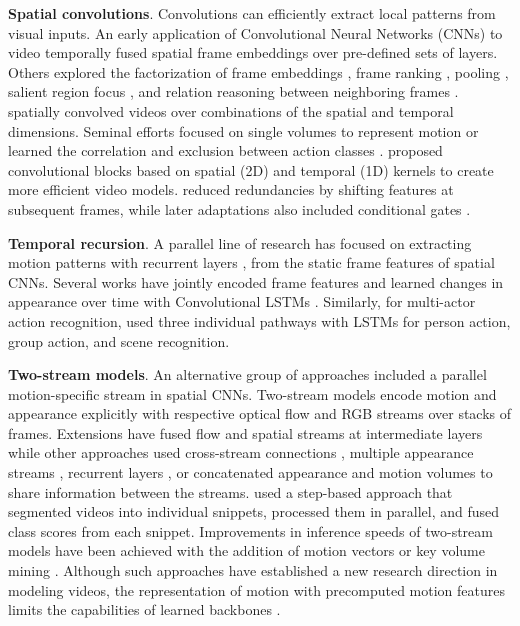 \noindent
\textbf{Spatial convolutions}. Convolutions can efficiently extract local patterns from visual inputs. An early application of Convolutional Neural Networks (CNNs) to video  temporally fused spatial frame embeddings over pre-defined sets of layers. Others explored the factorization of frame embeddings , frame ranking , pooling , salient region focus , and relation reasoning between neighboring frames .  spatially convolved videos over combinations of the spatial and temporal dimensions. Seminal efforts focused on single volumes to represent motion  or learned the correlation and exclusion between action classes .  proposed convolutional blocks based on spatial (2D) and temporal (1D) kernels to create more efficient video models.  reduced redundancies by shifting features at subsequent frames, while later adaptations also included conditional gates .

\noindent
\textbf{Temporal recursion}. A parallel line of research has focused on extracting motion patterns with recurrent layers , from the static frame features of spatial CNNs. Several works have jointly encoded frame features and learned changes in appearance over time with Convolutional LSTMs . Similarly, for multi-actor action recognition,  used three individual pathways with LSTMs for person action, group action, and scene recognition.

\noindent
\textbf{Two-stream models}. An alternative group of approaches included a parallel motion-specific stream in spatial CNNs. Two-stream models  encode motion and appearance explicitly with respective optical flow and RGB streams over stacks of frames. Extensions  have fused flow and spatial streams at intermediate layers while other approaches used cross-stream connections , multiple appearance streams , recurrent layers , or concatenated appearance and motion volumes  to share information between the streams.  used a step-based approach that segmented videos into individual snippets, processed them in parallel, and fused class scores from each snippet. Improvements in inference speeds of two-stream models have been achieved with the addition of motion vectors  or key volume mining . Although such approaches have established a new research direction in modeling videos, the representation of motion with precomputed motion features limits the capabilities of learned backbones . 


